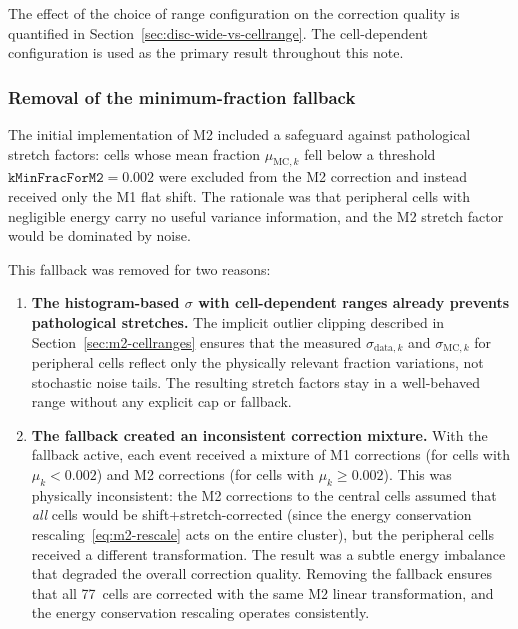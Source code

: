 \documentclass[11pt,a4paper]{article}
\begin{document}
The effect of the choice of range configuration on the correction
quality is quantified in Section~\ref{sec:disc-wide-vs-cellrange}.
The cell-dependent configuration is used as the primary result
throughout this note.


\subsubsection{Removal of the minimum-fraction fallback}
\label{sec:m2-no-fallback}

The initial implementation of M2 included a safeguard against
pathological stretch factors: cells whose mean fraction
$\mu_{\text{MC},k}$ fell below a threshold
$\texttt{kMinFracForM2} = 0.002$ were excluded from the M2 correction
and instead received only the M1 flat shift.  The rationale was that
peripheral cells with negligible energy carry no useful variance
information, and the M2 stretch factor would be dominated by noise.

This fallback was removed for two reasons:

\begin{enumerate}
  \item \textbf{The histogram-based $\sigma$ with cell-dependent ranges
        already prevents pathological stretches.}  The implicit
        outlier clipping described in
        Section~\ref{sec:m2-cellranges} ensures that the measured
        $\sigma_{\text{data},k}$ and $\sigma_{\text{MC},k}$ for
        peripheral cells reflect only the physically relevant
        fraction variations, not stochastic noise tails.  The
        resulting stretch factors stay in a well-behaved range without
        any explicit cap or fallback.

  \item \textbf{The fallback created an inconsistent correction
        mixture.}  With the fallback active, each event received a
        mixture of M1 corrections (for cells with $\mu_k < 0.002$)
        and M2 corrections (for cells with $\mu_k \geq 0.002$).
        This was physically inconsistent: the M2 corrections to the
        central cells assumed that \emph{all} cells would be
        shift+stretch-corrected (since the energy conservation
        rescaling~\eqref{eq:m2-rescale} acts on the entire cluster),
        but the peripheral cells received a different transformation.
        The result was a subtle energy imbalance that degraded the
        overall correction quality.  Removing the fallback ensures that
        all 77~cells are corrected with the same M2 linear
        transformation, and the energy conservation rescaling operates
        consistently.
\end{enumerate}
\end{document}

